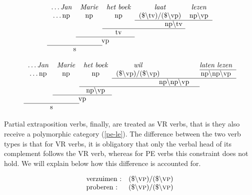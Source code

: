 {\sc
\begin{equation}
\mbox{
\begin{tabular}[t]{ccccccc}
\ldots {\em Jan} & {\em Marie} & {\em het boek} & {\em laat} & {\em lezen} \\
\ldots np & np & np & $(\$\backslash$tv$)/(\$\backslash$vp$)$ & np$\backslash$vp  
\\
\cline{4-5}
&&& \multicolumn{2}{c}{np$\backslash$tv} \\
\cline{3-4} && tv \\
\cline{2-3} & \multicolumn{2}{c}{vp }\\
\cline{1-2} \multicolumn{2}{c}{s}
\end{tabular}
}
\end{equation}

\begin{equation}
\mbox{
\begin{tabular}[t]{cccc@{\hspace{2cm}}c}
\ldots {\em Jan} & {\em Marie} & {\em het boek} & {\em wil} & {\em laten lezen}  
\\
\cline{5-5}
\ldots np & np & np & $(\$\backslash$vp)$/(\$\backslash$vp) &
np$\backslash$np$\backslash$vp \\
\cline{4-5}
&&& \multicolumn{2}{c}{np$\backslash$np$\backslash$vp} \\
\cline{3-4} && np$\backslash$vp \\
\cline{2-3} & \multicolumn{2}{c}{vp }\\
\cline{1-2} \multicolumn{2}{c}{s}
\end{tabular}
}
\end{equation}
} 

Partial extraposition verbs, finally, are treated as VR verbs, that is 
they also receive a polymorphic category (\ref{pe-le}).  The difference between 
the 
two verb types is
that for VR verbs, it is obligatory that only the verbal head of its complement
follows the VR verb, whereas for PE verbs this constraint does not hold.  We 
will
explain below how this difference is accounted for.

\begin{equation}
\label{pe-le}
\begin{array}[t]{ll}
\mbox{verzuimen :} & (\$\backslash \mbox{\sc vp})/(\$\backslash \mbox{\sc vp} ) 
\\ 
\mbox{proberen :} & (\$\backslash\mbox{\sc vp})/(\$\backslash \mbox{\sc vp} )
\end{array}
\end{equation}

